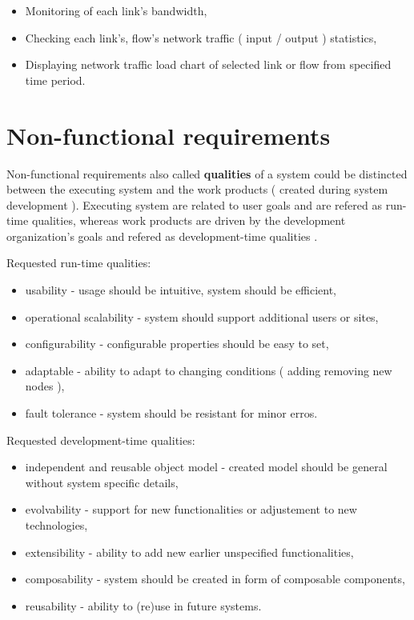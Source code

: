 \documentclass[11pt]{book}
\begin{document}
		\begin{itemize}
			\item{Monitoring of each link's bandwidth, }
			\item{Checking each link's, flow's network traffic ( input / output ) statistics, }
			\item{Displaying network traffic load chart of selected link or flow from specified time period. }
		\end{itemize}

    \section{Non-functional requirements}
		\label{sec:req:nonfunc}

	
		Non-functional requirements also called \textbf{qualities} of a system could be distincted between 
		the executing system and the work products ( created during system development ). Executing system are related
		to user goals and are refered as run-time qualities, whereas work products are driven by the development organization’s
		goals and refered as development-time qualities \cite{nonfunctional}. 

                \medskip
		
		Requested run-time qualities:
		\begin{itemize}
			\item{usability - usage should be intuitive, system should be efficient,}
			\item{operational scalability - system should support additional users or sites, }
			\item{configurability - configurable properties should be easy to set,}
			\item{adaptable - ability to adapt to changing conditions ( adding removing new nodes ),}
			\item{fault tolerance - system should be resistant for minor erros.}
		\end{itemize}
		
		\medskip
		
		Requested development-time qualities:
		\begin{itemize}
			\item{independent and reusable object model - created model should be general without system specific details, }
			\item{evolvability - support for new functionalities or adjustement to new technologies,}
			\item{extensibility - ability to add new earlier unspecified functionalities, }
			\item{composability - system should be created in form of composable components, }
			\item{reusability - ability to (re)use in future systems.}
		\end{itemize}
		
\end{document}
